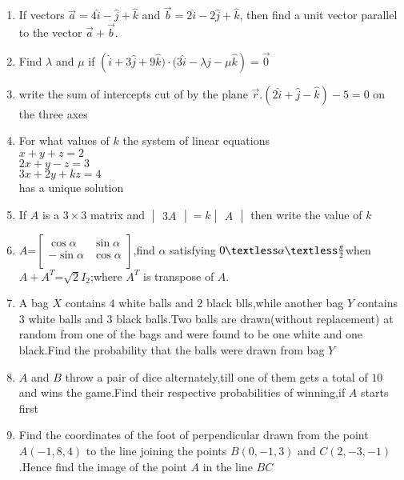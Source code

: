 \documentclass[12pt,-letter paper]{article}
\providecommand{\mydet}[1]{\ensuremath{\begin{vmatrix}#1\end{vmatrix}}}
\providecommand{\myvec}[1]{\ensuremath{\begin{bmatrix}#1\end{bmatrix}}}
\providecommand{\brak}[1]{\ensuremath{\left(#1\right)}}
\begin{document}
\begin{enumerate}
	\item If vectors $\overset{\rightarrow}{a} = 4\hat{i} - \hat{j} + \hat{k}$ and $\overset{\rightarrow}{b} = 2\hat{i} - 2\hat{j} + \hat{k}$, then find a unit vector parallel to the vector $\overset{\rightarrow}{a} + \overset{\rightarrow}{b}$.

 \item Find $\lambda$ and $\mu$ if $\brak{\hat{i} +3\hat{j} + 9\hat{k}) \cdot (3\hat{i} - \lambda \hat{j} - \mu \hat{k}} =\overset\rightarrow 0$
  

 \item  write the sum of intercepts cut of by the plane $\overset{\rightarrow}{r}.\brak{2\hat{i}+\hat{j}-\hat{k}}-5=0$     on the three axes



\item For what values of $k$ the system of linear equations\\
$x+y+z=2$\\
$2x+y-z=3$\\
$3x+2y+kz=4$\\
has a unique solution

\item If $A$ is a $3\times3$ matrix and $\mydet{3A}=k\mydet{A}$ then     write the value of $k$


 \item $A$=$\myvec{\cos\alpha&\sin\alpha\\                           -\sin\alpha&\cos\alpha\\}$,find $\alpha$ satisfying $0\textless\alpha\textless\frac{\pi}{2}$when $A+A^T$=$\sqrt{2}$$I_{2}$;where $A^T$ is     transpose of $A$.

	\item A bag $X$ contains $4$ white balls and $2$ black blls,while another bag $Y$ contains $3$ white balls and $3$ black balls.Two balls are drawn(without replacement) at random from one of the bags and were found to be one white and one black.Find the probability that the balls were drawn from bag $Y$
	
	\item $A$ and $B$ throw a pair of dice alternately,till one of them gets a total of $10$ and wins the game.Find their respective probabilities of winning,if $A$ starts first		


	\item Find the coordinates of the foot of perpendicular drawn from the point $A\brak{-1,8,4}$ to the line joining the points $B\brak{0,-1,3}$ and $C\brak{2,-3,-1}$.Hence find the image of the point $A$ in the line $BC$




\end{enumerate}
\end{document}
